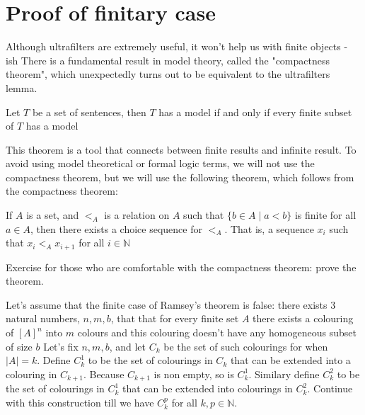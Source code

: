 	\section[Proof of finitary case]{Proof of finitary case}
	\begin{frame}
		Although ultrafilters are extremely useful, it won't help us with finite objects \pause - ish\pause\newline
		There is a fundamental result in model theory, called the "compactness theorem", which unexpectedly turns out to be equivalent to the ultrafilters lemma.\pause
		\begin{theorem}
			Let $T$ be a set of sentences, then $T$ has a model if and only if every finite subset of $T$ has a model
		\end{theorem}\pause
		This theorem is a tool that connects between finite results and infinite result.\pause\newline
		To avoid using model theoretical or formal logic terms, we will not use the compactness theorem, but we will use the following theorem, which follows from the compactness theorem:
	\end{frame}
	\begin{frame}
		\begin{theorem}
			If $A$ is a set, and $<_A$ is a relation on $A$ such that $\{b\in A\mid a<b\}$ is finite for all $a\in A$, then there exists a choice sequence for $<_A$.\newline
			That is, a sequence $x_i$ such that $x_i<_A x_{i+1}$ for all $i\in\mathbb{N}$
		\end{theorem}\pause
		Exercise for those who are comfortable with the compactness theorem: prove the theorem.
	\end{frame}
	\begin{frame}
		Let's assume that the finite case of Ramsey's theorem is false: \pause there exists 3 natural numbers, $n,m,b$, that that for every finite set $A$ there exists a colouring of $[A]^n$ into $m$ colours and this colouring doesn't have any homogeneous subset of size $b$\pause\newline
		Let's fix $n,m,b$, and let $C_k$ be the set of such colourings for when $|A|=k$.\pause\newline
		Define $C_k^1$ to be the set of colourings in $C_k$ that can be extended into a colouring in $C_{k+1}$. Because $C_{k+1}$ is non empty, so is $C_k^1$.\pause\newline
		Similary define $C_k^2$ to be the set of colourings in $C_k^1$ that can be extended into colourings in $C_k^2$.\pause\newline
		Continue with this construction till we have $C_k^p$ for all $k,p\in\mathbb{N}$.
	\end{frame}

